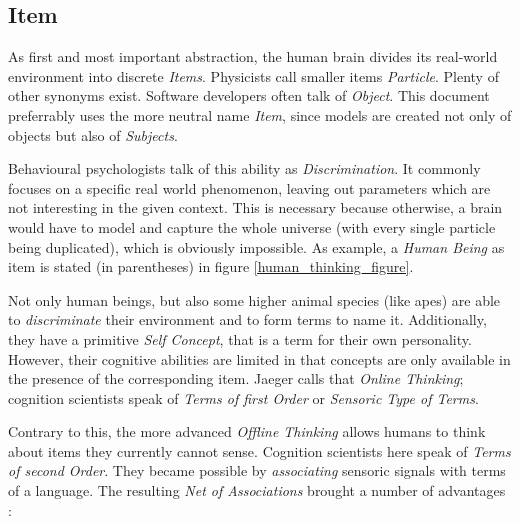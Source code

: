 %
%
%
%
%
%
%

\subsection{Item}
\label{item_heading}

As first and most important abstraction, the human brain divides its real-world
environment into discrete \emph{Items}. Physicists call smaller items \emph{Particle}.
Plenty of other synonyms exist. Software developers often talk of \emph{Object}.
This document preferrably uses the more neutral name \emph{Item}, since models
are created not only of objects but also of \emph{Subjects}.

Behavioural psychologists talk of this ability as \emph{Discrimination}. It commonly
focuses on a specific real world phenomenon, leaving out parameters which are not
interesting in the given context. This is necessary because otherwise, a brain
would have to model and capture the whole universe (with every single particle
being duplicated), which is obviously impossible. As example, a \emph{Human Being}
as item is stated (in parentheses) in figure \ref{human_thinking_figure}.

Not only human beings, but also some higher animal species (like apes) are able
to \emph{discriminate} their environment and to form terms to name it.
Additionally, they have a primitive \emph{Self Concept}, that is a term for
their own personality. However, their cognitive abilities are limited in that
concepts are only available in the presence of the corresponding item. Jaeger
\cite{jaeger} calls that \emph{Online Thinking}; cognition scientists speak of
\emph{Terms of first Order} or \emph{Sensoric Type of Terms}.

Contrary to this, the more advanced \emph{Offline Thinking} allows humans to
think about items they currently cannot sense. Cognition scientists here speak of
\emph{Terms of second Order}. They became possible by \emph{associating} sensoric
signals with terms of a language. The resulting \emph{Net of Associations} brought
a number of advantages \cite{jaeger}:

